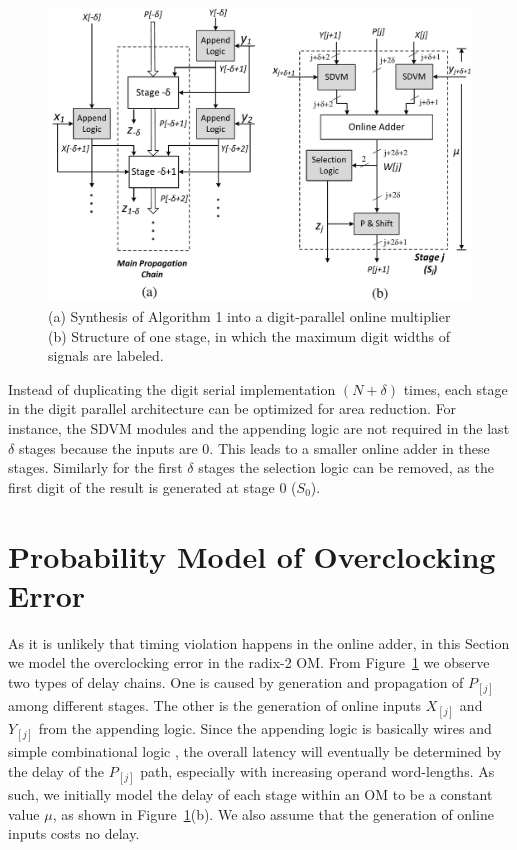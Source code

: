 \documentclass[journal]{IEEEtran}
\begin{document}
\begin{figure}[tbp]
  \centering
  \includegraphics[width=.49\textwidth]{./Figures/OM_Unrolled.pdf}
  \caption{(a) Synthesis of Algorithm 1 into a digit-parallel online multiplier (b) Structure of one stage, in which the maximum digit widths of signals are labeled.}
  \label{Fig:Radix2OnlineMultiplier}
\end{figure}

Instead of duplicating the digit serial implementation $(N+\delta)$ times, each stage in the digit parallel architecture can be optimized for area reduction. For instance, the SDVM modules and the appending logic are not required in the last $\delta$ stages because the inputs are 0. This leads to a smaller online adder in these stages. Similarly for the first $\delta$ stages the selection logic can be removed, as the first digit of the result is generated at stage 0 ($S_0$).


\section{Probability Model of Overclocking Error}

As it is unlikely that timing violation happens in the online adder, in this Section we model the overclocking error in the radix-2 OM. From Figure~\ref{Fig:Radix2OnlineMultiplier} we observe two types of delay chains. One is caused by generation and propagation of $P_{[j]}$ among different stages. The other is the generation of online inputs $X_{[j]}$ and $Y_{[j]}$ from the appending logic. Since the appending logic is basically wires and simple combinational logic \cite{Online_Conversion}, the overall latency will eventually be determined by the delay of the $P_{[j]}$ path, especially with increasing operand word-lengths. As such, we initially model the delay of each stage within an OM to be a constant value $\mu$, as shown in Figure~\ref{Fig:Radix2OnlineMultiplier}(b). We also assume that the generation of online inputs costs no delay.
\end{document}
